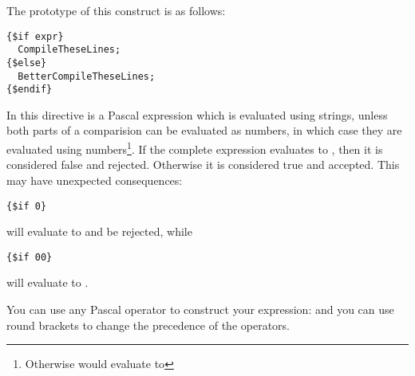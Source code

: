 The prototype of this construct is as follows:
\begin{verbatim}
{$if expr}
  CompileTheseLines;
{$else}
  BetterCompileTheseLines;
{$endif}
\end{verbatim}
In this directive  is a Pascal expression which is evaluated using
strings, unless both parts of a comparision can be evaluated as numbers,
in which case they are evaluated using numbers\footnote{Otherwise
 would evaluate to }.
If the complete expression evaluates to , then it is considered
false and rejected. Otherwise it is considered true and accepted. This may
have unexpected consequences:
\begin{verbatim}
{$if 0}
\end{verbatim}
will evaluate to  and be rejected, while
\begin{verbatim}
{$if 00}
\end{verbatim}
will evaluate to .

You can use any Pascal operator to construct your expression:  and you can use round brackets to change the
precedence of the operators.

